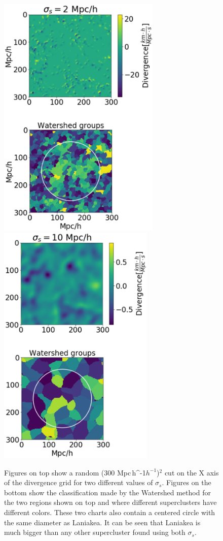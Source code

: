 \documentclass[usenatbib]{mnras}
\newcommand{\Mpch}{\,{\rm Mpc}\,\ifmmode h^{-1}\else $h^{-1}$\fi}
\begin{document}
\begin{figure}
    \centering
    \includegraphics[width=220pt]{smooth_watershed_01.pdf}
    \includegraphics[width=211pt]{smooth_watershed_05.pdf}
    \caption{Figures on top show a random (300\,\Mpch)$^2$ cut on the
      X axis of the divergence grid for two different values of
      $\sigma_s$. Figures on the bottom show the classification made
      by the Watershed method for the two regions shown on top and
      where different superclusters have different colors. These two
      charts also contain a centered circle with the same diameter as
      Laniakea. It can be seen that Laniakea is much bigger than any
      other supercluster found using both $\sigma_s$.} 
    \label{fig:1Pert}
\end{figure}
\end{document}

